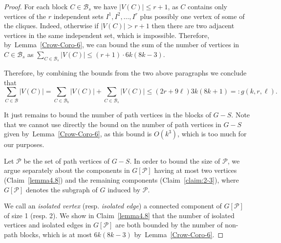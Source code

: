 \documentclass[
final
]{dmtcs-episciences}
\begin{document}
\begin{proof}
For each block $C\in\mathcal{B}_s$ we have $|V(C)|\leq r + 1$, as $C$ contains only vertices of the $r$ independent sets $I^1,I^2,\ldots,I^r$ plus possibly one vertex of some of the cliques. Indeed, otherwise if  $|V(C)|> r + 1$ then there are two adjacent vertices in the same independent set, which is impossible. Therefore, by~Lemma~\ref{Crow-Coro-6}, we can bound  the sum of the number of vertices in $C\in\mathcal{B}_s$ as $\sum_{C\in\mathcal{B}_s}{|V(C)|}\leq (r+1)\cdot 6k(8k-3)$.

Therefore, by combining the bounds from the two above paragraphs we conclude that
\begin{equation}\label{eq:non-path-blocks}
\sum_{C\in\mathcal{B}}{|V(C)|} = \sum_{C\in\mathcal{B}_b}{|V(C)|}+\sum_{C\in\mathcal{B}_s}{|V(C)|} \leq (2r + 9\ell)3k(8k+1) =: g(k,r,\ell).
\end{equation}

It just remains to bound the number of path vertices in the blocks of $G-S$. Note that we cannot use directly the bound on the number of path vertices in $G-S$ given by~Lemma~\ref{Crow-Coro-6}, as this bound is $O(k^3)$, which is too much for our purposes.

Let $\mathcal{P}$ be the set of path vertices of $G-S$. In order to bound the size of $\mathcal{P}$, we argue separately about the components in $G[\mathcal{P}]$ having at most two vertices (Claim~\ref{lemma4.8}) and the remaining components (Claim~\ref{claim:2-3}), where $G[\mathcal{P}]$ denotes the subgraph of $G$ induced by $\mathcal{P}$.

We call an {\it{isolated vertex}} (resp. \emph{isolated edge}) a connected component of $G[\mathcal{P}]$ of size 1 (resp. 2).
We show in Claim~\ref{lemma4.8}  that the number of isolated vertices and isolated edges in $G[\mathcal{P}]$ are both bounded by the number of non-path blocks, which is at most $6k(8k-3)$ by~Lemma~\ref{Crow-Coro-6}.


\end{proof}
\end{document}
